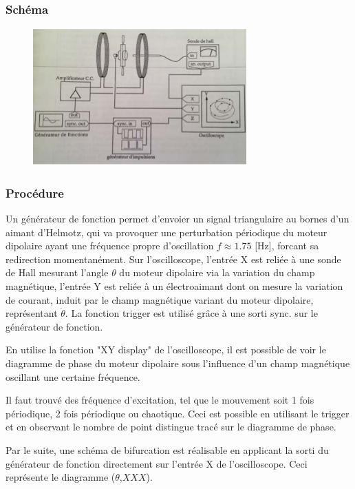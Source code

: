\documentclass[a4paper,12pt,oneside]{article}
\begin{document}
\subsubsection{Schéma}
\begin{figure}[h!]
  \begin{center}
  \includegraphics[width=0.6\linewidth,angle=0]{./figures/moteur1.png}
  \caption{} \label{fig:}
  \end{center}
\end{figure}


\subsubsection{Procédure}

Un générateur de fonction permet d'envoier un signal triangulaire au
 bornes d'un aimant d'Helmotz, qui va provoquer une perturbation périodique du
 moteur dipolaire ayant une fréquence propre d'oscillation $f\approx1.75$ [Hz], forcant sa redirection momentanément. Sur l'oscilloscope, l'entrée X est reliée à une
 sonde de Hall mesurant l'angle $\theta$ du moteur dipolaire via la variation du champ magnétique,
 l'entrée Y est reliée à un électroaimant dont on
 mesure la variation de courant, induit par le champ magnétique
 variant du moteur dipolaire, représentant $\dot{\theta}$. La fonction trigger est utilisé grâce
 à une sorti sync. sur le générateur de fonction.

En utilise la fonction "XY display" de l'oscilloscope, il est possible de voir le diagramme de phase du moteur dipolaire sous l'influence d'un champ magnétique oscillant  une certaine fréquence.

Il faut trouvé des fréquence d'excitation, tel que le mouvement soit 1 fois périodique, 2 fois périodique ou chaotique. Ceci est possible en utilisant le trigger et en observant le nombre de point distingue tracé sur le diagramme de phase.

Par le suite, une schéma de bifurcation est réalisable en applicant la sorti du générateur de fonction directement sur l'entrée X de l'oscilloscope. Ceci représente le diagramme ($\theta$,$XXX$).%
\end{document}
